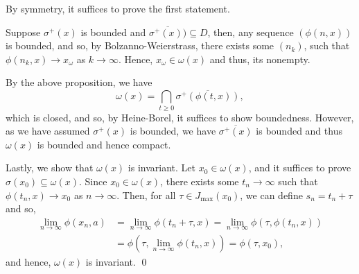 \documentclass[
]{article}
\theoremstyle{definition}
\theoremstyle{definition}
\begin{document}
By symmetry, it suffices to prove the first statement.

Suppose \(\sigma^+(x)\) is bounded and
\(\overline{\sigma^+(x))} \subseteq D\), then, any sequence
\((\phi(n, x))\) is bounded, and so, by Bolzanno-Weierstrass, there
exists some \((n_k)\), such that \(\phi(n_k, x) \to x_\omega\) as
\(k \to \infty\). Hence, \(x_\omega \in \omega(x)\) and thus, its
nonempty.

By the above proposition, we have
\[\omega(x) = \bigcap_{t \ge 0} \overline{\sigma^+(\phi(t, x))},\] which
is closed, and so, by Heine-Borel, it suffices to show boundedness.
However, as we have assumed \(\sigma^+(x)\) is bounded, we have
\(\overline{\sigma^+(x)}\) is bounded and thus \(\omega(x)\) is bounded
and hence compact.

Lastly, we show that \(\omega(x)\) is invariant. Let
\(x_0 \in \omega(x)\), and it suffices to prove
\(\sigma(x_0) \subseteq \omega(x)\). Since \(x_0 \in  \omega(x)\), there
exists some \(t_n \to \infty\) such that \(\phi(t_n, x) \to x_0\) as
\(n \to \infty\). Then, for all \(\tau \in J_{\max}(x_0)\), we can
define \(s_n = t_n + \tau\) and so, \[\begin{split}
    \lim_{n \to \infty} \phi(x_n, a) & = \lim_{n \to \infty} \phi(t_n + \tau, x) = 
      \lim_{n \to \infty} \phi(\tau, \phi(t_n, x))\\
      & = \phi(\tau, \lim_{n \to \infty} \phi(t_n, x)) = \phi(\tau, x_0),
  \end{split}\] and hence, \(\omega(x)\) is invariant. \qed
\end{document}
